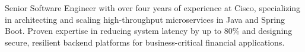 \documentclass[10pt,a4paper,ragged2e, normalphoto]{altacv}
\begin{document}

\begin{fullwidth}
\makecvheader
\smallskip
Senior Software Engineer with over four years of experience at Cisco, specializing in architecting and scaling high-throughput microservices in Java and Spring Boot. Proven expertise in reducing system latency by up to 80\% and designing secure, resilient backend platforms for business-critical financial applications.\newline
\end{fullwidth}



\end{document}

